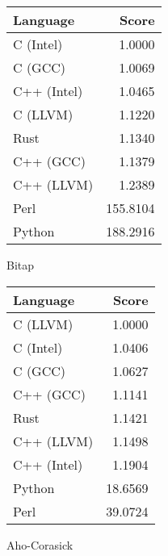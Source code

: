\begin{subtable}{0.33\textwidth}
    \centering
    \begin{tabular}{|l|r|}
        \hline
        Language & Score \\
        \hline
        C (Intel) & 1.0000 \\
        C (GCC) & 1.0069 \\
        C++ (Intel) & 1.0465 \\
        C (LLVM) & 1.1220 \\
        Rust & 1.1340 \\
        C++ (GCC) & 1.1379 \\
        C++ (LLVM) & 1.2389 \\
        Perl & 155.8104 \\
        Python & 188.2916 \\
        \hline
    \end{tabular}
    \caption{Bitap}
    \label{table:runtime:shift_or}
\end{subtable}
\begin{subtable}{0.33\textwidth}
    \centering
    \begin{tabular}{|l|r|}
        \hline
        Language & Score \\
        \hline
        C (LLVM) & 1.0000 \\
        C (Intel) & 1.0406 \\
        C (GCC) & 1.0627 \\
        C++ (GCC) & 1.1141 \\
        Rust & 1.1421 \\
        C++ (LLVM) & 1.1498 \\
        C++ (Intel) & 1.1904 \\
        Python & 18.6569 \\
        Perl & 39.0724 \\
        \hline
    \end{tabular}
    \caption{Aho-Corasick}
    \label{table:runtime:aho_corasick}
\end{subtable}%

